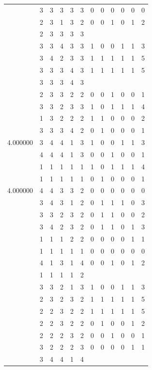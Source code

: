 \documentclass[]{book}
\theoremstyle{definition}
\theoremstyle{definition}
\theoremstyle{definition}
\theoremstyle{remark}
\begin{document}
\begin{table}
{\begin{tabular}[t]{rrrrrrrrrrrr}
 & 3 & 3 & 3 & 3 & 3 & 0 & 0 & 0 & 0 & 0 & 0\\
 & 2 & 3 & 1 & 3 & 2 & 0 & 0 & 1 & 0 & 1 & 2\\
 & 2 & 3 & 3 & 3 & 3 &  &  &  &  &  & \\
 & 3 & 3 & 4 & 3 & 3 & 1 & 0 & 0 & 1 & 1 & 3\\
 & 3 & 4 & 2 & 3 & 3 & 1 & 1 & 1 & 1 & 1 & 5\\
 & 3 & 3 & 3 & 4 & 3 & 1 & 1 & 1 & 1 & 1 & 5\\
 & 3 & 3 & 3 & 4 & 3 &  &  &  &  &  & \\
 & 2 & 3 & 3 & 2 & 2 & 0 & 0 & 1 & 0 & 0 & 1\\
 & 3 & 3 & 2 & 3 & 3 & 1 & 0 & 1 & 1 & 1 & 4\\
 & 1 & 3 & 2 & 2 & 2 & 1 & 1 & 0 & 0 & 0 & 2\\
 & 3 & 3 & 3 & 4 & 2 & 0 & 1 & 0 & 0 & 0 & 1\\
4.000000 & 3 & 4 & 4 & 1 & 3 & 1 & 0 & 0 & 1 & 1 & 3\\
 & 4 & 4 & 4 & 1 & 3 & 0 & 0 & 1 & 0 & 0 & 1\\
 & 1 & 1 & 1 & 1 & 1 & 1 & 0 & 1 & 1 & 1 & 4\\
 & 1 & 1 & 1 & 1 & 1 & 0 & 1 & 0 & 0 & 0 & 1\\
4.000000 & 4 & 4 & 3 & 3 & 2 & 0 & 0 & 0 & 0 & 0 & 0\\
 & 3 & 4 & 3 & 1 & 2 & 0 & 1 & 1 & 1 & 0 & 3\\
 & 3 & 3 & 2 & 3 & 2 & 0 & 1 & 1 & 0 & 0 & 2\\
 & 3 & 4 & 2 & 3 & 2 & 0 & 1 & 1 & 0 & 1 & 3\\
 & 1 & 1 & 1 & 2 & 2 & 0 & 0 & 0 & 0 & 1 & 1\\
 & 1 & 1 & 1 & 1 & 1 & 0 & 0 & 0 & 0 & 0 & 0\\
 & 4 & 1 & 3 & 1 & 4 & 0 & 0 & 1 & 0 & 1 & 2\\
 & 1 & 1 & 1 & 1 & 2 &  &  &  &  &  & \\
 & 3 & 3 & 2 & 1 & 3 & 1 & 0 & 0 & 1 & 1 & 3\\
 & 2 & 3 & 2 & 3 & 2 & 1 & 1 & 1 & 1 & 1 & 5\\
 & 2 & 2 & 3 & 2 & 2 & 1 & 1 & 1 & 1 & 1 & 5\\
 & 2 & 2 & 3 & 2 & 2 & 0 & 1 & 0 & 0 & 1 & 2\\
 & 2 & 2 & 2 & 3 & 2 & 0 & 0 & 1 & 0 & 0 & 1\\
 & 3 & 2 & 2 & 2 & 3 & 0 & 0 & 0 & 0 & 1 & 1\\
 & 3 & 4 & 4 & 1 & 4 &  &  &  &  &  & \\

\end{tabular}}
\end{table}
\end{document}
